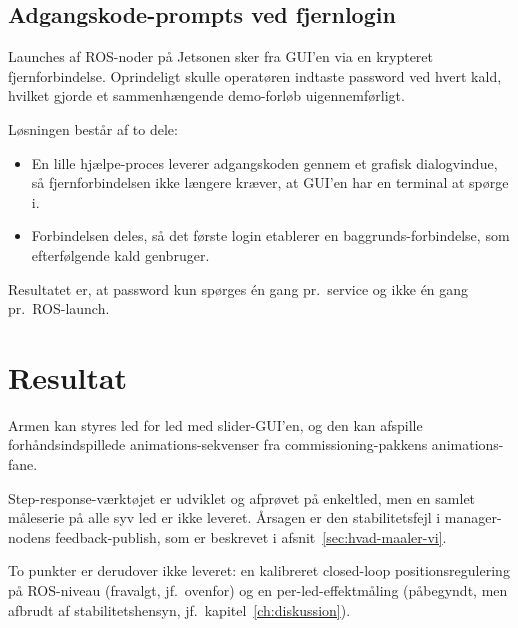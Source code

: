 \subsection{Adgangskode-prompts ved fjernlogin}

Launches af ROS-noder på Jetsonen sker fra GUI'en via en krypteret
fjernforbindelse. Oprindeligt skulle operatøren indtaste password
ved hvert kald, hvilket gjorde et sammenhængende demo-forløb
uigennemførligt.

Løsningen består af to dele:

\begin{itemize}
    \item En lille hjælpe-proces leverer adgangskoden gennem et
          grafisk dialogvindue, så fjernforbindelsen ikke længere
          kræver, at GUI'en har en terminal at spørge i.
    \item Forbindelsen deles, så det første login etablerer en
          baggrunds-forbindelse, som efterfølgende kald genbruger.
\end{itemize}

Resultatet er, at password kun spørges én gang pr.~service og ikke
én gang pr.~ROS-launch.

\section{Resultat}

Armen kan styres led for led med slider-GUI'en, og den kan afspille
forhåndsindspillede animations-sekvenser fra commissioning-pakkens
animations-fane.

Step-response-værktøjet er udviklet og afprøvet på enkeltled, men en
samlet måleserie på alle syv led er ikke leveret. Årsagen er den
stabilitetsfejl i manager-nodens feedback-publish, som er beskrevet i
afsnit~\ref{sec:hvad-maaler-vi}.

To punkter er derudover ikke leveret: en kalibreret closed-loop
positionsregulering på ROS-niveau (fravalgt, jf.~ovenfor) og en
per-led-effektmåling (påbegyndt, men afbrudt af stabilitetshensyn,
jf.~kapitel~\ref{ch:diskussion}).

